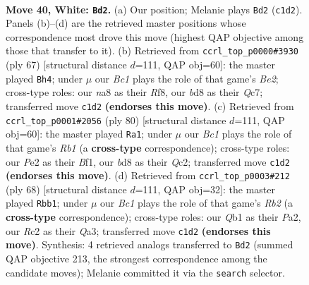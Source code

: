 \documentclass[11pt]{article}
\begin{document}
\clearpage

\begin{figure}[p]\centering
\begin{subfigure}{0.46\textwidth}\centering
\resizebox{\linewidth}{!}{%
\newchessgame
\chessboard[
  setfen={n1rb2k1/pb1q2n1/5r2/P1p2p1p/3p1Pp1/1P4P1/2R1P1BP/RQBNN1K1 w - - 12 40},
  showmover=false,
  pgfstyle=straightmove, color=movearrow, markmove={c1-d2}
]}
\caption{}
\end{subfigure}\hfill
\begin{subfigure}{0.46\textwidth}\centering
\resizebox{\linewidth}{!}{%
\newchessgame
\chessboard[
  setfen={2r2r2/2qnbp1k/p1bpp1pp/P3P3/3B1P2/1NN1Q2P/1PP2RP1/3R3K b - - 4 34},
  showmover=false,
  pgfstyle=straightmove, color=movearrow, markmove={e7-h4}
]}
\caption{}
\end{subfigure}
\\[4pt]
\begin{subfigure}{0.46\textwidth}\centering
\resizebox{\linewidth}{!}{%
\newchessgame
\chessboard[
  setfen={b2r2k1/4q1p1/1p1pprn1/6b1/PpP4p/1P3P1P/2Q1N1PB/1R1R1B1K w - - 2 41},
  showmover=false,
  pgfstyle=straightmove, color=movearrow, markmove={b1-a1}
]}
\caption{}
\end{subfigure}\hfill
\begin{subfigure}{0.46\textwidth}\centering
\resizebox{\linewidth}{!}{%
\newchessgame
\chessboard[
  setfen={r1b3k1/p1q2p2/r6b/n1BPp3/3pP1p1/Q2P2P1/PR2BP1P/4R1NK w - - 1 35},
  showmover=false,
  pgfstyle=straightmove, color=movearrow, markmove={b2-b1}
]}
\caption{}
\end{subfigure}
\caption{\textbf{Move 40, White: \texttt{Bd2}.} (a) Our position; Melanie plays \texttt{Bd2} (\texttt{c1d2}). Panels (b)--(d) are the retrieved master positions whose correspondence most drove this move (highest QAP objective among those that transfer to it). (b) Retrieved from \texttt{ccrl\_top\_p0000\#3930} (ply 67) [structural distance $d$=111, QAP obj=60]: the master played \texttt{Bh4}; under $\mu$ our \emph{Bc1} plays the role of that game's \emph{Be2}; cross-type roles: our \emph{n}a8 as their \emph{R}f8, our \emph{b}d8 as their \emph{Q}c7; transferred move \texttt{c1d2} \textbf{(endorses this move)}. (c) Retrieved from \texttt{ccrl\_top\_p0001\#2056} (ply 80) [structural distance $d$=111, QAP obj=60]: the master played \texttt{Ra1}; under $\mu$ our \emph{Bc1} plays the role of that game's \emph{Rb1} (a \textbf{cross-type} correspondence); cross-type roles: our \emph{P}e2 as their \emph{B}f1, our \emph{b}d8 as their \emph{Q}c2; transferred move \texttt{c1d2} \textbf{(endorses this move)}. (d) Retrieved from \texttt{ccrl\_top\_p0003\#212} (ply 68) [structural distance $d$=111, QAP obj=32]: the master played \texttt{Rbb1}; under $\mu$ our \emph{Bc1} plays the role of that game's \emph{Rb2} (a \textbf{cross-type} correspondence); cross-type roles: our \emph{Q}b1 as their \emph{P}a2, our \emph{R}c2 as their \emph{Q}a3; transferred move \texttt{c1d2} \textbf{(endorses this move)}. Synthesis: 4 retrieved analogs transferred to \texttt{Bd2} (summed QAP objective 213, the strongest correspondence among the candidate moves); Melanie committed it via the \texttt{search} selector.}
\label{fig:thought-m78}
\end{figure}
\end{document}
